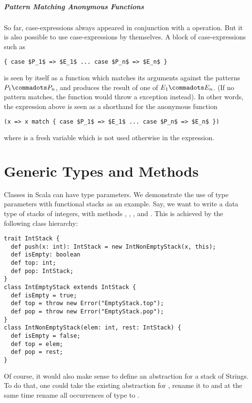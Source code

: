 \documentclass[a4paper,12pt,twoside,titlepage]{book}
\begin{document}
\paragraph{Pattern Matching Anonymous Functions}

So far, case-expressions always appeared in conjunction with a
\verb@match@ operation. But it is also possible to use
case-expressions by themselves. A block of case-expressions such as
\begin{lstlisting}
{ case $P_1$ => $E_1$ ... case $P_n$ => $E_n$ }
\end{lstlisting}
is seen by itself as a function which matches its arguments
against the patterns $P_1 \commadots P_n$, and produces the result of
one of $E_1 \commadots E_n$. (If no pattern matches, the function
would throw a  exception instead).
In other words, the expression above is seen as a shorthand for the anonymous function
\begin{lstlisting}
(x => x match { case $P_1$ => $E_1$ ... case $P_n$ => $E_n$ })
\end{lstlisting}
where  is a fresh variable which is not used 
otherwise in the expression.

\chapter{Generic Types and Methods}

Classes in Scala can have type parameters. We demonstrate the use of
type parameters with functional stacks as an example. Say, we want to
write a data type of stacks of integers, with methods ,
, , and . This is achieved by the
following class hierarchy:
\begin{lstlisting}
trait IntStack {
  def push(x: int): IntStack = new IntNonEmptyStack(x, this);
  def isEmpty: boolean
  def top: int;
  def pop: IntStack;
}
class IntEmptyStack extends IntStack {
  def isEmpty = true;
  def top = throw new Error("EmptyStack.top");
  def pop = throw new Error("EmptyStack.pop");
}
class IntNonEmptyStack(elem: int, rest: IntStack) {
  def isEmpty = false;
  def top = elem;
  def pop = rest;
}
\end{lstlisting}
Of course, it would also make sense to define an abstraction for a
stack of Strings. To do that, one could take the existing abstraction
for , rename it to  and at the same
time rename all occurrences of type  to .
\end{document}

